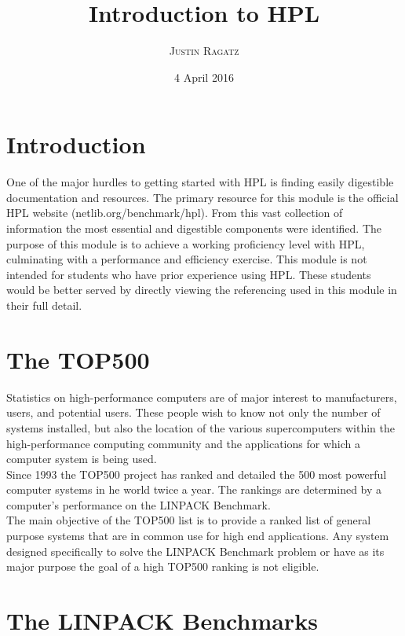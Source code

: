 \documentclass[a4paper, 11pt]{article}
\title{\textbf{Introduction to HPL}}
\author{\textsc{Justin Ragatz}}
\date{4 April 2016}
\makeatletter
\renewcommand{\maketitle}
{
	\begin{flushright}
	{\LARGE\@title}

	\vspace{20pt}

	{\large\@author}
	\end{flushright}
}
\makeatother
\begin{document}
\maketitle
\bigskip

\section{Introduction}
One of the major hurdles to getting started with HPL is finding easily digestible documentation and resources. The primary resource for this module is the official HPL website (netlib.org/benchmark/hpl). From this vast collection of information the most essential and digestible components were identified. The purpose of this module is to achieve a working proficiency level with HPL, culminating with a performance and efficiency exercise. This module is not intended for students who have prior experience using HPL. These students would be better served by directly viewing the referencing used in this module in their full detail.

\section{The TOP500}

Statistics on high-performance computers are of major interest to manufacturers, users, and potential users. These people wish to know not only the number of systems installed, but also the location of the various supercomputers within the high-performance computing community and the applications for which a computer system is being used.\cite{website:top} \\

Since 1993 the TOP500 project has ranked and detailed the 500 most powerful computer systems in he world twice a year. The rankings are determined by a computer's performance on the LINPACK Benchmark. \\

The main objective of the TOP500 list is to provide a ranked list of general purpose systems that are in common use for high end applications. Any system designed specifically to solve the LINPACK Benchmark problem or have as its major purpose the goal of a high TOP500 ranking is not eligible.

\section{The LINPACK Benchmarks}
\end{document}
